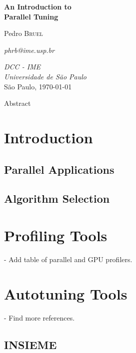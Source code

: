 \documentclass[a4paper, 12pt]{article}
\begin{document}
\hypersetup{backref,pdfpagemode=FullScreen,colorlinks=true}

\thispagestyle{empty}
\begin{center}
    \vspace*{4cm}
    \textbf{\Large{An Introduction to \\Parallel Tuning}}\\

    \vskip 1cm

    Pedro \textsc{Bruel}

    \emph{phrb@ime.usp.br}

    \vfill
    \normalsize{\emph{DCC - IME\\
    Universidade de São Paulo}\\}
    \normalsize{São Paulo, \today}
\end{center}

\newpage

\tableofcontents

\newpage

\abstract
Abstract

\section{Introduction} \label{sec:intro}

\subsection*{Parallel Applications}

\subsection*{Algorithm Selection}

\section{Profiling Tools}

- Add table of parallel and GPU profilers.

\section{Autotuning Tools}

- Find more references.

\subsection{INSIEME}
\end{document}

